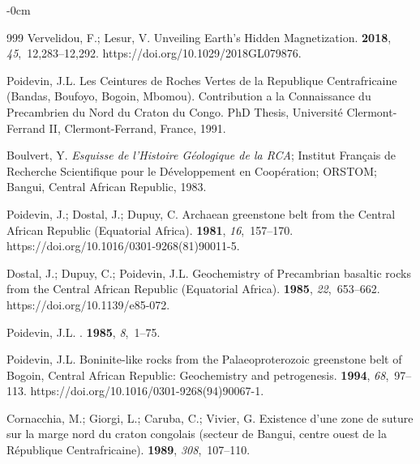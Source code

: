 \documentclass[minerals,article,accept,pdftex,moreauthors]{Definitions/mdpi}
\begin{document}
\begin{adjustwidth}{-\extralength}{0cm}
\begin{thebibliography}{999}
Vervelidou, F.; Lesur, V.
\newblock Unveiling Earth's Hidden Magnetization.
 {\bf 2018}, {\em
  45},~12,283--12,292.
\newblock https://doi.org/10.1029/2018GL079876.

Poidevin, J.L.
\newblock Les Ceintures de Roches Vertes de la Republique Centrafricaine
  (Bandas, Boufoyo, Bogoin, Mbomou). Contribution a la Connaissance du
  Precambrien du Nord du Craton du Congo.
\newblock PhD Thesis, Université Clermont-Ferrand II, Clermont-Ferrand,
  France,  1991.

Boulvert, Y.
\newblock \emph{Esquisse de l'Histoire Géologique de la RCA};
\newblock Institut Français de Recherche Scientifique pour le Développement en Coopération; ORSTOM; Bangui, Central African Republic, 1983. %

Poidevin, J.; Dostal, J.; Dupuy, C.
\newblock Archaean greenstone belt from the Central African Republic
  (Equatorial Africa).
 {\bf 1981}, {\em 16},~157--170.
\newblock https://doi.org/10.1016/0301-9268(81)90011-5.

Dostal, J.; Dupuy, C.; Poidevin, J.L.
\newblock Geochemistry of Precambrian basaltic rocks from the Central African
  Republic (Equatorial Africa).
 {\bf 1985}, {\em
  22},~653--662.
\newblock https://doi.org/10.1139/e85-072.

Poidevin, J.L.
.
 {\bf 1985}, {\em 8},~1--75.

Poidevin, J.L.
\newblock Boninite-like rocks from the Palaeoproterozoic greenstone belt of
  Bogoin, Central African Republic: Geochemistry and petrogenesis.
 {\bf 1994}, {\em 68},~97--113.
\newblock https://doi.org/10.1016/0301-9268(94)90067-1.

Cornacchia, M.; Giorgi, L.; Caruba, C.; Vivier, G.
\newblock Existence d'une zone de suture sur la marge nord du craton congolais
  (secteur de Bangui, centre ouest de la R{\'e}publique Centrafricaine).
  {\bf 1989}, {\em 308},~107--110.


\end{thebibliography}
\end{adjustwidth}
\end{document}

